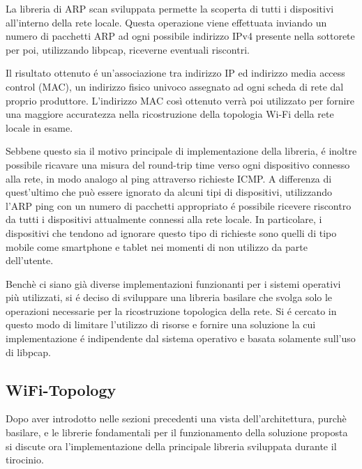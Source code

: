 La libreria di ARP scan sviluppata permette la scoperta di tutti i dispositivi all'interno della rete locale.
Questa operazione viene effettuata inviando un numero di pacchetti ARP ad ogni possibile indirizzo IPv4 presente nella sottorete per poi, utilizzando libpcap, riceverne eventuali riscontri.

Il risultato ottenuto \'e un'associazione tra indirizzo IP ed indirizzo media access control (MAC), un indirizzo fisico univoco assegnato ad ogni scheda di rete dal proprio produttore.
L'indirizzo MAC cos\`i ottenuto verr\`a poi utilizzato per fornire una maggiore accuratezza nella ricostruzione della topologia Wi-Fi della rete locale in esame.

Sebbene questo sia il motivo principale di implementazione della libreria, \'e inoltre possibile ricavare una misura del round-trip time verso ogni dispositivo connesso alla rete, in modo analogo al ping attraverso richieste ICMP.
A differenza di quest'ultimo che pu\`o essere ignorato da alcuni tipi di dispositivi, utilizzando l'ARP ping con un numero di pacchetti appropriato \'e possibile ricevere riscontro da tutti i dispositivi attualmente connessi alla rete locale.
In particolare, i dispositivi che tendono ad ignorare questo tipo di richieste sono quelli di tipo mobile come smartphone e tablet nei momenti di non utilizzo da parte dell'utente.

Bench\`e ci siano gi\`a diverse implementazioni funzionanti per i sistemi operativi pi\`u utilizzati, si \'e deciso di sviluppare una libreria basilare che svolga solo le operazioni necessarie per la ricostruzione topologica della rete.
Si \'e cercato  in questo modo di limitare l'utilizzo di risorse e fornire una soluzione la cui implementazione \'e indipendente dal sistema operativo e basata solamente sull'uso di libpcap.

\newpage



\subsection{WiFi-Topology}
Dopo aver introdotto nelle sezioni precedenti una vista dell'architettura, purch\`e basilare, e le librerie fondamentali per il funzionamento della soluzione proposta si discute ora l'implementazione della principale libreria sviluppata durante il tirocinio.

